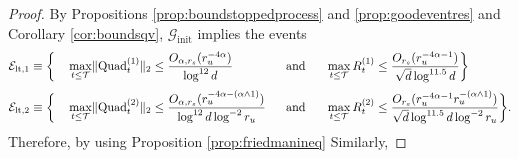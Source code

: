 \begin{proof}
{}
By Propositions \ref{prop:boundstoppedprocess} and \ref{prop:goodeventres} and Corollary \ref{cor:boundsqv},  $\mathcal{G}_{\text{init}}$ implies  the events
\begin{alignat}{4}
& \mathcal{E}_{\mathrm{lt},1} \equiv \bigg \lbrace &&\max_{t \leq \mathcal{T}}  \lVert \text{Quad}^{(1)}_{t}\rVert_2 \leq \frac{O_{\alpha, r_s}( r_u^{- 4 \alpha})}{\log^{12} d} ~~&& \text{and} ~~   
&& \max_{t \leq \mathcal{T}}   R_{t}^{(1)}     \leq  \frac{ O_{r_s}( r_u^{- 4 \alpha - 1}) }{\sqrt{d} \log^{11.5} d}   \bigg \rbrace  \\[0.25em]
&  \mathcal{E}_{\mathrm{lt},2} \equiv \bigg \lbrace && \max_{t \leq \mathcal{T}}  \lVert \text{Quad}^{(2)}_{t}\rVert_2 \leq \frac{O_{\alpha, r_s}(r_u^{- 4 \alpha - (\alpha \wedge 1)}  )}{\log^{12} d  \log^{-2} r_u}  ~~&& \text{and} ~~ 
&& \max_{t \leq \mathcal{T}}   R_{t}^{(2)}    \leq   \frac{ O_{r_s}( r_u^{- 4 \alpha - 1}  r_u^{- (\alpha \wedge 1)})  }{\sqrt{d} \log^{11.5} d  \log^{-2} r_u}   \bigg \rbrace . 
\end{alignat}
Therefore, by using Proposition \ref{prop:friedmanineq}
Similarly,
\end{proof} 

